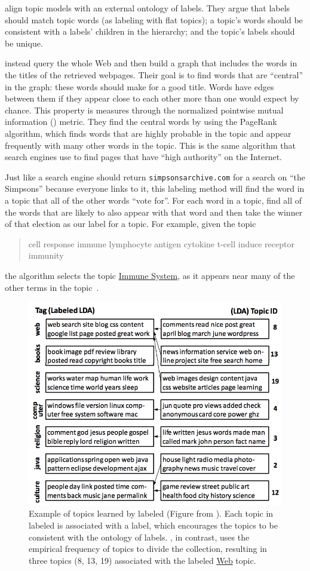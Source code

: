 \citet{mao-12} align topic models with an external ontology of labels.
They argue that labels should match topic words (as labeling with flat
topics); a topic's words should be consistent with a labels' children
in the hierarchy; and the topic's labels should be unique.

\citet{aleteras-14} instead query the whole Web and then build a graph that
includes the words in the titles of the retrieved webpages. 
Their goal is to find words that are ``central'' in the graph: these
words should make for a good title.
Words have edges between them if they appear close to each other more
than one would expect by chance.
This property is measures through the normalized pointwise mutual
information () metric.
They find the central words by using the PageRank~\citep{page-99}
algorithm, which finds words that are highly probable in the topic and appear frequently
with many other words in the topic.
This is the same algorithm that search engines use to find pages that
have ``high authority'' on the Internet.

Just like a search engine should return \texttt{simpsonsarchive.com}
for a search on ``the Simpsons'' because everyone links to it, this
labeling method will find the word in a topic that all of the other
words ``vote for''.  
For each word in a topic, find all of the
words that are likely to also appear with that word and then take the
winner of that election as our label for a topic.  For example, given
the topic
\begin{quote}
cell response immune lymphocyte antigen cytokine t-cell induce
receptor immunity
\end{quote}
the algorithm selects the topic \underline{Immune System}, as it appears near many of
the other terms in the topic~\citep{aleteras-14}.
\begin{figure}[t]
  \begin{center}
    \includegraphics[width=.7\linewidth]{figures/viz_llda}
  \end{center}
  \caption{Example of topics learned by labeled  (Figure from
    \citet{ramage-09}).  Each topic in labeled  is associated with a
    label, which encourages the topics to be consistent with the ontology of
    labels.  , in contrast, uses the empirical frequency of topics to
    divide the collection, resulting in three topics (8, 13, 19) associated with
    the labeled  \underline{Web} topic. }
  \label{fig:llda}
\end{figure}

